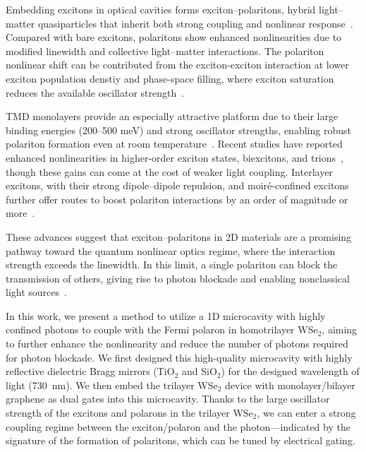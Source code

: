 Embedding excitons in optical cavities forms exciton--polaritons, hybrid light--matter quasiparticles that inherit both strong coupling and nonlinear response~\cite{Liu2015-hm,Deng2010-ul}. 
Compared with bare excitons, polaritons show enhanced nonlinearities due to modified linewidth and collective light--matter interactions. 
The polariton nonlinear shift can be contributed from the exciton-exciton interaction at lower exciton population denstiy\cite{Gu2021-cu,Ciuti2003-zj} and phase-space filling,
where exciton saturation reduces the available oscillator strength~\cite{Song2024-na,Gu2021-cu}.  

TMD monolayers provide an especially attractive platform due to their large binding energies (200--500 meV) and strong oscillator strengths, enabling robust polariton formation even at room temperature~\cite{Wang2018-my}. 
Recent studies have reported enhanced nonlinearities in higher-order exciton states, biexcitons, and trions~\cite{Gu2021-cu,Wei2023-by,Emmanuele2020-oh}, though these gains can come at the cost of weaker light coupling. 
Interlayer excitons, with their strong dipole--dipole repulsion, and moiré-confined excitons further offer routes to boost polariton interactions by an order of magnitude or more~\cite{Datta2022-po,Leisgang2020-mn,Louca2023-in,Zhang2021-eb}.  

These advances suggest that exciton--polaritons in 2D materials are a promising pathway toward the quantum nonlinear optics regime, where the interaction strength exceeds the linewidth. 
In this limit, a single polariton can block the transmission of others, giving rise to photon blockade and enabling nonclassical light sources~\cite{Somaschi2016-uk,Verger2006-jz,He2013-od,Delteil2019-pp,Turunen2022-wo}.

In this work, we present a method to utilize a 1D microcavity with highly confined photons to couple with the Fermi polaron in homotrilayer WSe$_2$, aiming to further enhance the nonlinearity and reduce the number of photons required for photon blockade. 
We first designed this high-quality microcavity with highly reflective dielectric Bragg mirrors (TiO$_2$ and SiO$_2$) for the designed wavelength of light (730~nm). 
We then embed the trilayer WSe$_2$ device with monolayer/bilayer graphene as dual gates into this microcavity. 
Thanks to the large oscillator strength of the excitons and polarons in the trilayer WSe$_2$, we can enter a strong coupling regime between the exciton/polaron and the photon---indicated by the signature of the formation of polaritons, which can be tuned by electrical gating.

